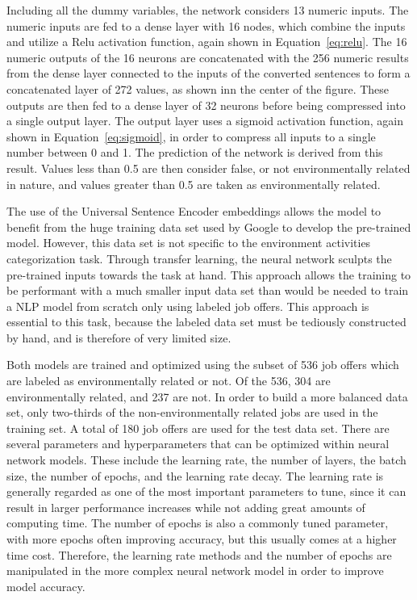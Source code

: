 Including all the dummy variables, the network considers 13 numeric inputs. The numeric inputs are fed to a dense layer with 16 nodes, which combine the inputs and utilize a Relu activation function, again shown in Equation~\ref{eq:relu}. The 16 numeric outputs of the 16 neurons are concatenated with the 256 numeric results from the dense layer connected to the inputs of the converted sentences to form a concatenated layer of 272 values, as shown inn the center of the figure. These outputs are then fed to a dense layer of 32 neurons before being compressed into a single output layer. The output layer uses a sigmoid activation function, again shown in Equation~\ref{eq:sigmoid}, in  order to compress all inputs to a single number between 0 and 1. The prediction of the network is derived from this result. Values less than 0.5 are then consider false, or not environmentally related in nature, and values greater than 0.5 are taken as environmentally related. 

The use of the Universal Sentence Encoder embeddings allows the model to benefit from the huge training data set used by Google to develop the pre-trained model. However, this data set is not specific to the environment activities categorization task. Through transfer learning, the neural network sculpts the pre-trained inputs towards the task at hand. This approach allows the training to be performant with a much smaller input data set than would be needed to train a NLP model from scratch only using labeled job offers. This approach is essential to this task, because the labeled data set must be tediously constructed by hand, and is therefore of very limited size.

Both models are trained and optimized using the subset of 536 job offers which are labeled as environmentally related or not. Of the 536, 304 are environmentally related, and 237 are not. In order to build a more balanced data set, only two-thirds of the non-environmentally related jobs are used in the training set. A total of 180 job offers are used for the test data set. There are several parameters and hyperparameters that can be optimized within neural network models. These include the learning rate, the number of layers, the batch size, the number of epochs, and the learning rate decay. The learning rate is generally regarded as one of the most important parameters to tune, since it can result in larger performance increases while not adding great amounts of computing time. The number of epochs is also a commonly tuned parameter, with more epochs often improving accuracy, but this usually comes at a higher time cost. Therefore, the learning rate methods and the number of epochs are manipulated in the more complex neural network model in order to improve model accuracy. 

